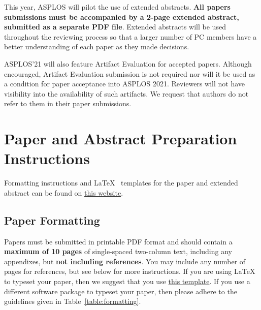 \documentclass[pageno]{jpaper}
\begin{document}
This year, ASPLOS will pilot the use of extended abstracts. {\bf All
  papers submissions must be accompanied by a 2-page extended
  abstract, submitted as a separate PDF file}.  Extended abstracts
will be used throughout the reviewing process so that a larger number
of PC members have a better understanding of each paper as they made
decisions.

ASPLOS'21 will also feature Artifact Evaluation for accepted papers. 
Although encouraged, Artifact Evaluation submission is not required nor will 
it be used as a condition for paper acceptance into ASPLOS 2021. Reviewers will 
not have visibility into the availability of such artifacts. We request that 
authors do not refer to them in their paper submissions.

\section{Paper and Abstract Preparation Instructions}

Formatting instructions and \LaTeX~ templates for the paper and
extended abstract can be found on
\href{https://asplos-conference.org/submissions/}{this website}.

\subsection{Paper Formatting}

Papers must be submitted in printable PDF format and should contain a
{\bf maximum of 10 pages} of single-spaced two-column text, including any
appendixes, but {\bf not
  including references}.  You may include any number of pages for
references, but see below for more instructions.  If you are using
\LaTeX~\cite{lamport94} to typeset your paper, then we suggest that
you use \href{https://asplos-conference.org/wp-content/uploads/2020/06/asplos21-templates.zip}{this template}.
If you use a different
software package to typeset your paper, then please adhere to the
guidelines given in Table~\ref{table:formatting}.
\end{document}
